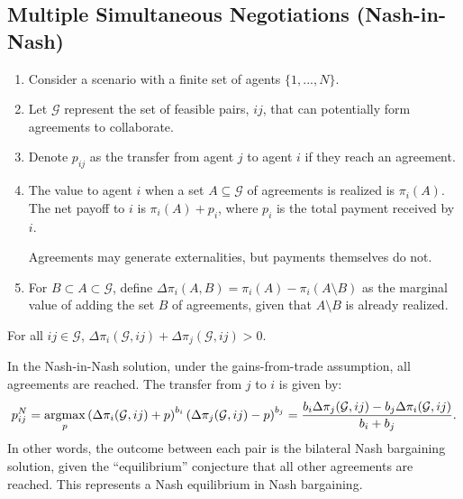 \documentclass[11pt]{elegantbook_2}
\newcommand{\argmax}{\operatornamewithlimits{argmax}}
\begin{document}
\subsection{Multiple Simultaneous Negotiations (Nash-in-Nash)}
\begin{enumerate}
    \item Consider a scenario with a finite set of agents $\{1,...,N\}$.
    \item Let $\mathcal{G}$ represent the set of feasible pairs, $ij$, that can potentially form agreements to collaborate.
    \item Denote $p_{ij}$ as the transfer from agent $j$ to agent $i$ if they reach an agreement.
    \item The value to agent $i$ when a set $A\subseteq \mathcal{G}$ of agreements is realized is $\pi_i(A)$. The net payoff to $i$ is $\pi_i(A)+p_i$, where $p_i$ is the total payment received by $i$.
    \begin{note}
        Agreements may generate externalities, but payments themselves do not.
    \end{note}
    \item For $B\subset A\subset \mathcal{G}$, define $\Delta\pi_i(A,B)=\pi_i(A)-\pi_i(A\setminus B)$ as the marginal value of adding the set $B$ of agreements, given that $A\setminus B$ is already realized.
\end{enumerate}

\begin{assumption}
    For all $ij\in \mathcal{G}$, $\Delta\pi_i(\mathcal{G},ij)+\Delta\pi_j(\mathcal{G},ij)>0$.
\end{assumption}

\begin{definition}
    In the Nash-in-Nash solution, under the gains-from-trade assumption, all agreements are reached. The transfer from $j$ to $i$ is given by:
    \begin{equation}
        \begin{aligned}
            p_{ij}^N=\argmax_{p}\left(\Delta\pi_i(\mathcal{G},ij)+p\right)^{b_i}\left(\Delta\pi_j(\mathcal{G},ij)-p\right)^{b_j}=\frac{b_i\Delta\pi_j(\mathcal{G},ij)-b_j\Delta\pi_i(\mathcal{G},ij)}{b_i+b_j}.
        \end{aligned}
        \nonumber
    \end{equation}
    In other words, the outcome between each pair is the bilateral Nash bargaining solution, given the “equilibrium” conjecture that all other agreements are reached. This represents a Nash equilibrium in Nash bargaining.
\end{definition}
\end{document}
